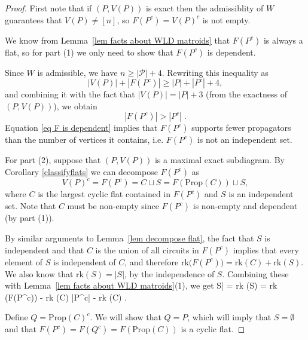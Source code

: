 \documentclass[11pt]{article}
\newcommand{\rk}{\textrm{rk} }
\def\ba #1\ea{\begin{align} #1 \end{align}}
\newcommand{\cP}{\mathcal{P}}
\newcommand{\Prop}{\textrm{Prop}}
\theoremstyle{remark}
\theoremstyle{definition}
\begin{document}
\begin{proof}

First note that if $(P,V(P))$ is exact then the admissiblity of $W$ guarantees that $V(P) \neq [n]$, so $F(P^c) = V(P)^c$ is not empty. 

We know from Lemma~\ref{lem facts about WLD matroids} that $F(P^c)$ is always a flat, so for part (1) we only need to show that $F(P^c)$ is dependent.

Since $W$ is admissible, we have $n \geq |\cP| + 4$. Rewriting this inequality as
\[|V(P)| + |F(P^c)|  \geq  |P| + |P^c| +4,\]
and combining it with the fact that $|V(P)| = |P| + 3$ (from the exactness of $(P,V(P))$), we obtain
\begin{equation}\label{eq F is dependent}|F(P^c)| > |P^c| \;.\end{equation}
Equation \eqref{eq F is dependent} implies that $F(P^c)$ supports fewer propagators than the number of vertices it contains, i.e. $F(P^c)$ is not an independent set.

For part (2), suppose that $(P, V(P))$ is a maximal exact subdiagram. By Corollary \ref{classifyflats} we can decompose $F(P^c)$ as
\begin{equation}\label{eq decompose F}V(P)^c = F(P^c) = C \sqcup S = F(\Prop(C)) \sqcup S,\end{equation}
where $C$ is the largest cyclic flat contained in $F(P^c)$ and $S$ is an  independent set. Note that $C$ must be non-empty since $F(P^c)$ is non-empty and dependent (by part (1)).

By similar arguments to Lemma~\ref{lem decompose flat}, the fact that $S$ is independent and that $C$ is the union of all circuits in $F(P^c)$ implies that every element of $S$ is independent of $C$, and therefore ${\rk\big(F(P^c)\big) = \rk(C) + \rk(S)}$. We also know that $\rk(S) = |S|$, by the independence of $S$. Combining these with Lemma~\ref{lem facts about WLD matroids}(1), we get \ba |S| = \rk(S) = \rk\big(F(P^c)\big) -  \rk(C) \leq |P^c| - \rk(C) \;. \label{increasingrank} \ea

Define $Q = \Prop(C)^c$. We will show that $Q=P$, which will imply that $S=\emptyset$ and that ${F(P^c) = F(Q^c) = F(\Prop(C))}$ is a cyclic flat.


\end{proof}
\end{document}
